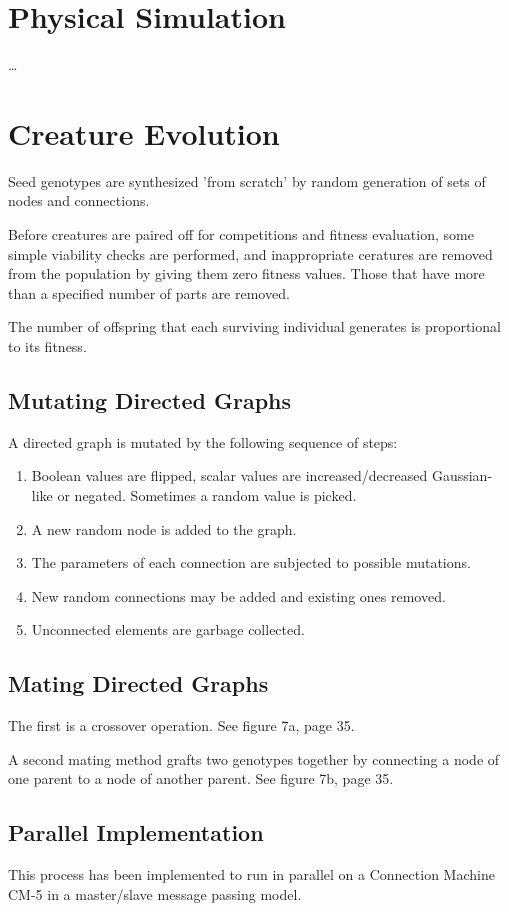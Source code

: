 \documentclass[12pt]{book}
\begin{document}
\section{Physical Simulation}
\dots

\section{Creature Evolution}
Seed genotypes are synthesized 'from scratch' by random generation of sets of nodes and connections.

Before creatures are paired off for competitions and fitness evaluation, some simple viability checks are performed, and inappropriate ceratures are removed from the population by giving them zero fitness values. Those that have more than a specified number of parts are removed.

The number of offspring that each surviving individual generates is proportional to its fitness.

\subsection{Mutating Directed Graphs}
A directed graph is mutated by the following sequence of steps:
\begin{enumerate}
\item Boolean values are flipped, scalar values are increased/decreased Gaussian-like or negated. Sometimes a random value is picked.
\item A new random node is added to the graph.
\item The parameters of each connection are subjected to possible mutations.
\item New random connections may be added and existing ones removed.
\item Unconnected elements are garbage collected.
\end{enumerate}

\subsection{Mating Directed Graphs}
The first is a crossover operation. See figure 7a, page 35.

A second mating method grafts two genotypes together by connecting a node of one parent to a node of another parent. See figure 7b, page 35.

\subsection{Parallel Implementation}
This process has been implemented to run in parallel on a Connection Machine CM-5 in a master/slave message passing model.
\end{document}
